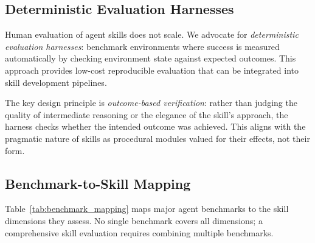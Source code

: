 \documentclass[conference, compsoc]{IEEEtran}
\theoremstyle{plain}
\begin{document}
{\subsection{Deterministic Evaluation Harnesses}
\label{sec:evaluation:harnesses}

Human evaluation of agent skills does not scale. We advocate for \emph{deterministic evaluation harnesses}: benchmark environments where success is measured automatically by checking environment state against expected outcomes. This approach provides low-cost reproducible evaluation that can be integrated into skill development pipelines.

The key design principle is \emph{outcome-based verification}: rather than judging the quality of intermediate reasoning or the elegance of the skill's approach, the harness checks whether the intended outcome was achieved. This aligns with the pragmatic nature of skills as procedural modules valued for their effects, not their form.

\subsection{Benchmark-to-Skill Mapping}
\label{sec:evaluation:benchmarks}

Table~\ref{tab:benchmark_mapping} maps major agent benchmarks to the skill dimensions they assess. No single benchmark covers all dimensions; a comprehensive skill evaluation requires combining multiple benchmarks.

}
\end{document}
